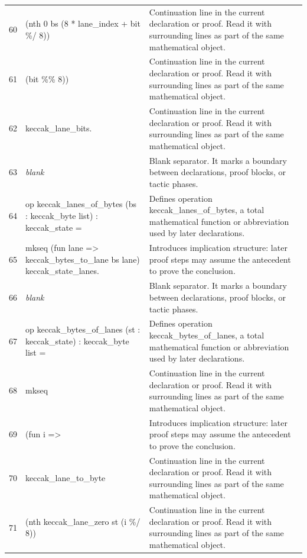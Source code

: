 \documentclass[10pt]{article}
\begin{document}
\begin{longtable}{r L{0.53\textwidth} L{0.37\textwidth}}
60 & {\ttfamily\scriptsize          (nth 0 bs (8 * lane\_index + bit \%/ 8))} & Continuation line in the current declaration or proof.  Read it with surrounding lines as part of the same mathematical object. \\
61 & {\ttfamily\scriptsize          (bit \%\% 8))} & Continuation line in the current declaration or proof.  Read it with surrounding lines as part of the same mathematical object. \\
62 & {\ttfamily\scriptsize     keccak\_lane\_bits.} & Continuation line in the current declaration or proof.  Read it with surrounding lines as part of the same mathematical object. \\
63 & {\ttfamily\scriptsize \emph{blank}} & Blank separator.  It marks a boundary between declarations, proof blocks, or tactic phases. \\
64 & {\ttfamily\scriptsize op keccak\_lanes\_of\_bytes (bs : keccak\_byte list) : keccak\_state =} & Defines operation keccak\_lanes\_of\_bytes, a total mathematical function or abbreviation used by later declarations. \\
65 & {\ttfamily\scriptsize   mkseq (fun lane => keccak\_bytes\_to\_lane bs lane) keccak\_state\_lanes.} & Introduces implication structure: later proof steps may assume the antecedent to prove the conclusion. \\
66 & {\ttfamily\scriptsize \emph{blank}} & Blank separator.  It marks a boundary between declarations, proof blocks, or tactic phases. \\
67 & {\ttfamily\scriptsize op keccak\_bytes\_of\_lanes (st : keccak\_state) : keccak\_byte list =} & Defines operation keccak\_bytes\_of\_lanes, a total mathematical function or abbreviation used by later declarations. \\
68 & {\ttfamily\scriptsize   mkseq} & Continuation line in the current declaration or proof.  Read it with surrounding lines as part of the same mathematical object. \\
69 & {\ttfamily\scriptsize     (fun i =>} & Introduces implication structure: later proof steps may assume the antecedent to prove the conclusion. \\
70 & {\ttfamily\scriptsize        keccak\_lane\_to\_byte} & Continuation line in the current declaration or proof.  Read it with surrounding lines as part of the same mathematical object. \\
71 & {\ttfamily\scriptsize          (nth keccak\_lane\_zero st (i \%/ 8))} & Continuation line in the current declaration or proof.  Read it with surrounding lines as part of the same mathematical object. \\

\end{longtable}
\end{document}
